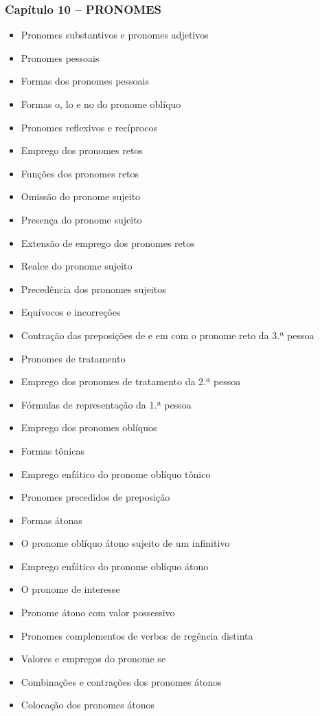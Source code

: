 \documentclass[a4paper,12pt]{article}[abntex2]
\begin{document}
\subsubsection*{Capítulo 10 – PRONOMES}
\begin{itemize}
    \item Pronomes substantivos e pronomes adjetivos
    \item Pronomes pessoais
    \item Formas dos pronomes pessoais
    \item Formas o, lo e no do pronome oblíquo
    \item Pronomes reflexivos e recíprocos
    \item Emprego dos pronomes retos
    \item Funções dos pronomes retos
    \item Omissão do pronome sujeito
    \item Presença do pronome sujeito
    \item Extensão de emprego dos pronomes retos
    \item Realce do pronome sujeito
    \item Precedência dos pronomes sujeitos
    \item Equívocos e incorreções
    \item Contração das preposições de e em com o pronome reto da 3.ª pessoa
    \item Pronomes de tratamento
    \item Emprego dos pronomes de tratamento da 2.ª pessoa
    \item Fórmulas de representação da 1.ª pessoa
    \item Emprego dos pronomes oblíquos
    \item Formas tônicas
    \item Emprego enfático do pronome oblíquo tônico
    \item Pronomes precedidos de preposição
    \item Formas átonas
    \item O pronome oblíquo átono sujeito de um infinitivo
    \item Emprego enfático do pronome oblíquo átono
    \item O pronome de interesse
    \item Pronome átono com valor possessivo
    \item Pronomes complementos de verbos de regência distinta
    \item Valores e empregos do pronome se
    \item Combinações e contrações dos pronomes átonos
    \item Colocação dos pronomes átonos
\end{itemize}
\end{document}
